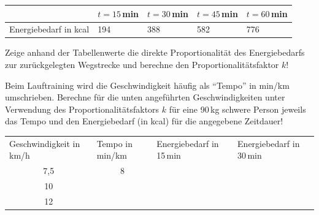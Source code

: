 \begin{langesbeispiel}
\begin{enumerate}
\begin{center}
	\begin{tabular}{|l|l|l|l|l|}\cline{2-5}
	\multicolumn{1}{c|}{}&$t=15$\,min&$t=30$\,min&$t=45$\,min&$t=60$\,min\\ \hline
	Energiebedarf in kcal&194&388&582&776\\ \hline	
	\end{tabular}
\end{center}

Zeige anhand der Tabellenwerte die direkte Proportionalität des Energiebedarfs zur zurückgelegten Wegstrecke und berechne den Proportionalitätsfaktor $k$!

Beim Lauftraining wird die Geschwindigkeit häufig als "`Tempo"' in min/km umschrieben. Berechne für die unten angeführten Geschwindigkeiten unter Verwendung des Proportionalitätsfaktors $k$ für eine 90\,kg schwere Person jeweils das Tempo und den Energiebedarf (in kcal) für die angegebene Zeitdauer!

\begin{center}
	\begin{tabular}{|p{3cm}|p{3cm}|p{3cm}|p{3cm}|}\hline
	\multirow{2}{2cm}{Geschwindigkeit in km/h}&\multirow{2}{2cm}{Tempo in min/km}&\multirow{2}{2cm}{Energiebedarf in 15\,min}&\multirow{2}{2cm}{Energiebedarf in 30\,min}\\
	&&&\\ \hline \hline
	\multicolumn{1}{|c|}{7,5}&\multicolumn{1}{c|}{8}&&\\ \hline
	\multicolumn{1}{|c|}{10}&&&\\ \hline
	\multicolumn{1}{|c|}{12}&&&\\ \hline	
	\end{tabular}
\end{center}
\end{enumerate}

\end{langesbeispiel}

